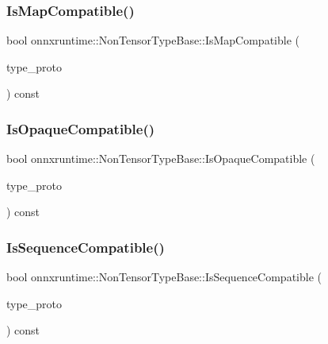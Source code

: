 \subsubsection{\texorpdfstring{Is\+Map\+Compatible()}{IsMapCompatible()}}
{\footnotesize\ttfamily bool onnxruntime\+::\+Non\+Tensor\+Type\+Base\+::\+Is\+Map\+Compatible (\begin{DoxyParamCaption}\item[{const O\+N\+N\+X\+\_\+\+N\+A\+M\+E\+S\+P\+A\+C\+E\+::\+Type\+Proto \&}]{type\+\_\+proto }\end{DoxyParamCaption}) const\hspace{0.3cm}{\ttfamily [protected]}}

\mbox{\label{classonnxruntime_1_1NonTensorTypeBase_a70bd68569e639137686e8d8de0ec342d}} 
\subsubsection{\texorpdfstring{Is\+Opaque\+Compatible()}{IsOpaqueCompatible()}}
{\footnotesize\ttfamily bool onnxruntime\+::\+Non\+Tensor\+Type\+Base\+::\+Is\+Opaque\+Compatible (\begin{DoxyParamCaption}\item[{const O\+N\+N\+X\+\_\+\+N\+A\+M\+E\+S\+P\+A\+C\+E\+::\+Type\+Proto \&}]{type\+\_\+proto }\end{DoxyParamCaption}) const\hspace{0.3cm}{\ttfamily [protected]}}

\mbox{\label{classonnxruntime_1_1NonTensorTypeBase_a51332c7112f44e9ba69c93c6ee0c222e}} 
\subsubsection{\texorpdfstring{Is\+Sequence\+Compatible()}{IsSequenceCompatible()}}
{\footnotesize\ttfamily bool onnxruntime\+::\+Non\+Tensor\+Type\+Base\+::\+Is\+Sequence\+Compatible (\begin{DoxyParamCaption}\item[{const O\+N\+N\+X\+\_\+\+N\+A\+M\+E\+S\+P\+A\+C\+E\+::\+Type\+Proto \&}]{type\+\_\+proto }\end{DoxyParamCaption}) const\hspace{0.3cm}{\ttfamily [protected]}}

